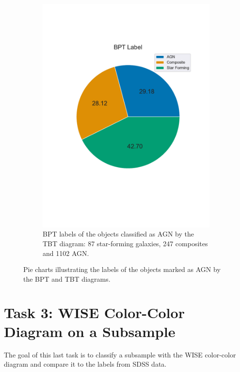 \documentclass[letterpaper, oneside]{article}
\begin{document}
\begin{figure}[H]
\begin{subfigure}[b]{0.4\textwidth}
		\includegraphics[width=\textwidth]{../TBT_diagrams/bpt_label_pie.pdf}
		\caption{BPT labels of the objects classified as AGN by the TBT diagram: 87 star-forming galaxies, 247 composites and 1102 AGN.}
		\label{fig:T2_tbt_label_pie}
	\end{subfigure}
	\caption{Pie charts illustrating the labels of the objects marked as AGN by the BPT and TBT diagrams.}
	\label{fig:tbt_pie_charts}
\end{figure}
	
	
	\section*{Task 3: WISE Color-Color Diagram on a Subsample}
	
	The goal of this last task is to classify a subsample with the WISE color-color diagram and compare it to the labels from SDSS data.
	
\end{document}
